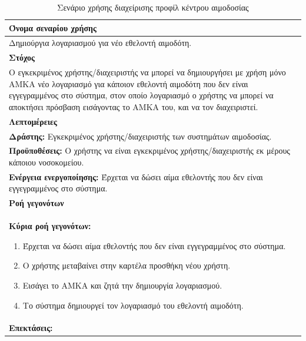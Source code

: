 \begin{table}[H]
	\begin{center}
	    \begin{tabular}{|p{\dimexpr \linewidth-2\tabcolsep}|}
	    \hline
	    \rowcolor{grayy}
	    \textbf{Όνομα σεναρίου χρήσης}
	    \\ \hline    
	    Δημιούργια λογαριασμού για νέο εθελοντή αιμοδότη.
	     \\ \hline
	    \rowcolor{grayy}
	    \textbf{\textbf{Στόχος}}
	    \\ \hline
	 	 Ο εγκεκριμένος χρήστης/διαχειριστής να μπορεί να δημιουργήσει με χρήση μόνο ΑΜΚΑ νέο λογαριασμό για κάποιον εθελοντή αιμοδότη που δεν είναι εγγεγραμμένος στο σύστημα, στον οποίο λογαριασμό ο χρήστης να μπορεί να αποκτήσει πρόσβαση εισάγοντας το ΑΜΚΑ του, και να τον διαχειριστεί.
	    \\ \hline
	    \rowcolor{grayy}
	    \textbf{Λεπτομέρειες}
	    \\ \hline
		\textbf{Δράστης:} Εγκεκριμένος χρήστης/διαχειριστής των συστημάτων αιμοδοσίας.
		\\*
		\textbf{Προϋποθέσεις:} Ο χρήστης να είναι εγκεκριμένος χρήστης/διαχειριστής εκ μέρους κάποιου νοσοκομείου.
		\\*
		\textbf{Ενέργεια ενεργοποίησης:} Έρχεται να δώσει αίμα εθελοντής που δεν είναι εγγεγραμμένος στο σύστημα.
		\\ \hline
		\rowcolor{grayy}    
	    \textbf{Ροή γεγονότων}
	    \\ \hline
		\textbf{Κύρια ροή γεγονότων:}
		\begin{enumerate}
			\item	 Έρχεται να δώσει αίμα εθελοντής που δεν είναι εγγεγραμμένος στο σύστημα.
			\item Ο χρήστης μεταβαίνει στην καρτέλα προσθήκη νέου χρήστη.
			\item Εισάγει το ΑΜΚΑ και ζητά την δημιουργία λογαριασμού.
			\item Το σύστημα δημιουργεί τον λογαριασμό του εθελοντή αιμοδότη.
		\end{enumerate}
		\\ \hline
		\textbf{Επεκτάσεις:}
		   \\ \hline
	    \end{tabular}
	    \caption{Σενάριο χρήσης διαχείρισης προφίλ κέντρου αιμοδοσίας}
	    \label{tab:create_new_donor_account}
	\end{center}
\end{table}	



